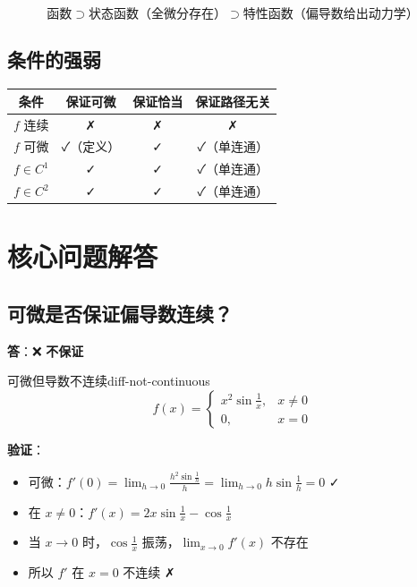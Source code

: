 \documentclass[12pt,a4paper]{article}
\begin{document}
\begin{equation}
\text{函数} \supset \text{状态函数（全微分存在）} \supset \text{特性函数（偏导数给出动力学）}
\end{equation}

\subsection{条件的强弱}

\begin{table}[h]
\centering
\begin{tabular}{cccc}
\toprule
条件 & 保证可微 & 保证恰当 & 保证路径无关 \\
\midrule
$f$ 连续 & ✗ & ✗ & ✗ \\
$f$ 可微 & ✓（定义） & ✓ & ✓（单连通） \\
$f \in C^1$ & ✓ & ✓ & ✓（单连通） \\
$f \in C^2$ & ✓ & ✓ & ✓（单连通） \\
\bottomrule
\end{tabular}
\end{table}

\section{核心问题解答}

\subsection{可微是否保证偏导数连续？}

\textbf{答}：❌ \textbf{不保证}

\begin{example}{可微但导数不连续}{diff-not-continuous}
\begin{equation}
f(x) = \begin{cases}
x^2 \sin\frac{1}{x}, & x \neq 0 \\
0, & x = 0
\end{cases}
\end{equation}

\textbf{验证}：
\begin{itemize}
\item 可微：$f'(0) = \lim_{h \to 0} \frac{h^2\sin\frac{1}{h}}{h} = \lim_{h \to 0} h\sin\frac{1}{h} = 0$ ✓
\item 在 $x \neq 0$：$f'(x) = 2x\sin\frac{1}{x} - \cos\frac{1}{x}$
\item 当 $x \to 0$ 时，$\cos\frac{1}{x}$ 振荡，$\lim_{x \to 0} f'(x)$ 不存在
\item 所以 $f'$ 在 $x=0$ 不连续 ✗
\end{itemize}
\end{example}
\end{document}
